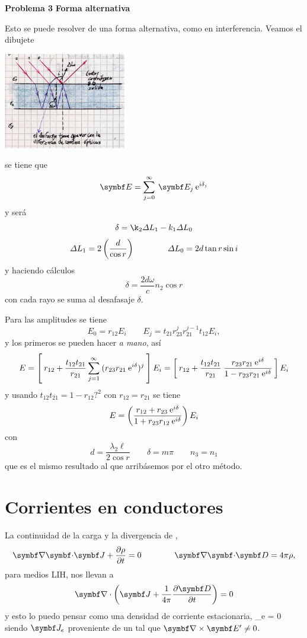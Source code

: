 \documentclass[10pt,oneside]{CBFT_book}
\begin{document}
\begin{ejemplo}{\bf Problema 3}
{\bf Forma alternativa}

Esto se puede resolver de una forma alternativa, como en interferencia. Veamos el dibujete

\includegraphics[width=0.4\textwidth]{images/fig_ft1_problema3B_ondas.jpg}
 
se tiene que
\[
	\vb{E} = \sum_{j=0}^\infty \: \vb{E}_j \euler^{i \delta_j }
\]
y será
\[
	\delta = \k_2 \Delta L_1 - k_1 \Delta L_0
\]
\[
	\Delta L_1 = 2 \left( \frac{ d }{ \cos r } \right) \qquad \qquad 
	\Delta L_0 = 2 d \tan r \sin i
\]
y haciendo cálculos
\[
	\delta = \frac{2 d \omega }{c} n_2 \cos r
\]
con cada rayo se suma al desafasaje $\delta$.

Para las amplitudes se tiene
\[
	E_0 = r_{12} E_i \qquad E_j = t_{21} r_{23}^j r_{21}^{j-1} t_{12} E_i,
\]
y los primeros se pueden hacer {\it a mano}, así
\[
	E = \left[ \: r_{12} + \frac{t_{12}t_{21}}{r_{21}} \sum_{j=1}^\infty \: 
	( r_{23} r_{21} \:\mathrm{e}^{i\delta} )^j \: \right] E_i = 
	\left[ \: r_{12} + \frac{t_{12}t_{21}}{r_{21}} \: 
	\frac{ r_{23} r_{21} \:\mathrm{e}^{i\delta} }{1 - r_{23} r_{21} \:\mathrm{e}^{i\delta} } \: \right] E_i 
\]
y usando $ t_{12} t_{21} = 1 - r_{12}?^2 $ con $r_{12} = r_{21}$ se tiene
\[
	E = \left( \frac{ r_{12} + r_{23} \:\mathrm{e}^{i\delta} }{1 + r_{23} r_{12} \:\mathrm{e}^{i\delta} } \right) E_i
\]
con 
\[
	d = \frac{ \lambda_2 \ell }{ 2 \cos r} \qquad \delta = m\pi \qquad n_3 = n_1
\]
que es el mismo resultado al que arribásemos por el otro método.
 
\end{ejemplo}


\section{Corrientes en conductores}

La continuidad de la carga y la divergencia de ,
\[
	\divem{J} + \dpar{\rho}{t} = 0 \qquad \qquad \divem{D} = 4\pi \rho,
\]
para medios LIH, nos llevan a
\[
	\Nabla\cdot \left( \vb{J} + \frac{1}{4\pi} \dpar{\vb{D}}{t} \right) = 0
\]
y esto lo puedo pensar como una densidad de corriente estacionaria,
\be
	_e = 0
	\label{diver_jcond}
\ee
siendo $\vb{J}_e$ proveniente de un  tal que $\rotorm{E'} \neq 0$.
\end{document}
